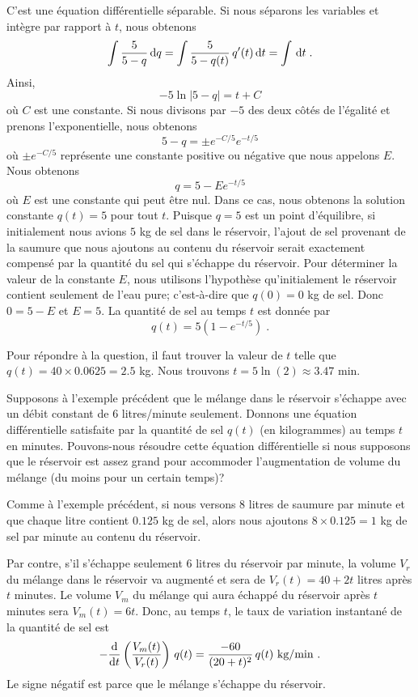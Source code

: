 {\begin{egg}[\eng]
C'est une équation différentielle séparable.  Si nous séparons les
variables et intègre par rapport à $t$, nous obtenons
\[
\int \frac{5}{5-q} \dx{q} =
\int \frac{5}{5- q(t)}\, q'(t) \dx{t} = \int \dx{t} \; .
\]
Ainsi,
\[
-5\ln|5-q| = t + C
\]
où $C$ est une constante.  Si nous divisons par $-5$ des deux côtés de
l'égalité et prenons l'exponentielle, nous obtenons
\[
5-q = \pm e^{-C/5} e^{-t/5}
\]
où $\pm e^{-C/5}$ représente une constante positive ou négative que
nous appelons $E$.  Nous obtenons
\[
q = 5 - E e^{-t/5}
\]
où $E$ est une constante qui peut être nul.  Dans ce cas, nous obtenons
la solution constante $q(t) = 5$ pour tout $t$.  Puisque $q=5$ est un
point d'équilibre, si initialement nous avions $5$ kg 
de sel dans le réservoir, l'ajout de sel provenant de la saumure que
nous ajoutons au contenu du réservoir serait exactement compensé par la
quantité du sel qui s'échappe du réservoir.  Pour déterminer la
valeur de la constante $E$, nous utilisons l'hypothèse qu'initialement
le réservoir contient seulement de l'eau pure; c'est-à-dire que
$q(0)=0$ kg de sel.  Donc $0 = 5 -E$ et $E=5$.  La quantité de sel au
temps $t$ est donnée par
\[
q(t) = 5\left(1-e^{-t/5}\right) \; .
\]

Pour répondre à la question, il faut trouver la valeur de $t$ telle
que $q(t) = 40 \times 0.0625 = 2.5$ kg.  Nous trouvons
$t= 5 \ln(2) \approx 3.47$
min.
\end{egg}

\begin{egg}[\eng]
Supposons à l'exemple précédent que le mélange dans le réservoir
s'échappe avec un débit constant de $6$ litres/minute seulement.
Donnons une équation différentielle satisfaite par la quantité de sel
$q(t)$ (en kilogrammes) au temps $t$ en minutes.  Pouvons-nous résoudre
cette équation différentielle si nous supposons que le réservoir est assez
grand pour accommoder l'augmentation de volume du mélange (du moins
pour un certain temps)?

Comme à l'exemple précédent, si nous versons $8$ litres de saumure par
minute et que chaque litre contient $0.125$ kg de sel, alors nous ajoutons
$8\times 0.125=1$ kg de sel par minute au contenu du réservoir.

Par contre, s'il s'échappe seulement $6$ litres du réservoir par
minute, la volume $V_r$ du mélange dans le réservoir va augmenté et
sera de $V_r(t) = 40 + 2t$ litres après $t$ minutes.   Le volume $V_m$
du mélange qui aura échappé du réservoir après $t$ minutes sera
$V_m(t) = 6t$.  Donc, au temps $t$, le taux de variation instantané de
la quantité de sel est
\[
  -\dfdx{\left(\frac{V_m(t)}{V_r(t)}\right)}{t} \, q(t)
  = \frac{-60}{(20 + t)^2} \, q(t) \ \text{kg/min} \ .
\]
Le signe négatif est parce que le mélange s'échappe du réservoir.


\end{egg}}
